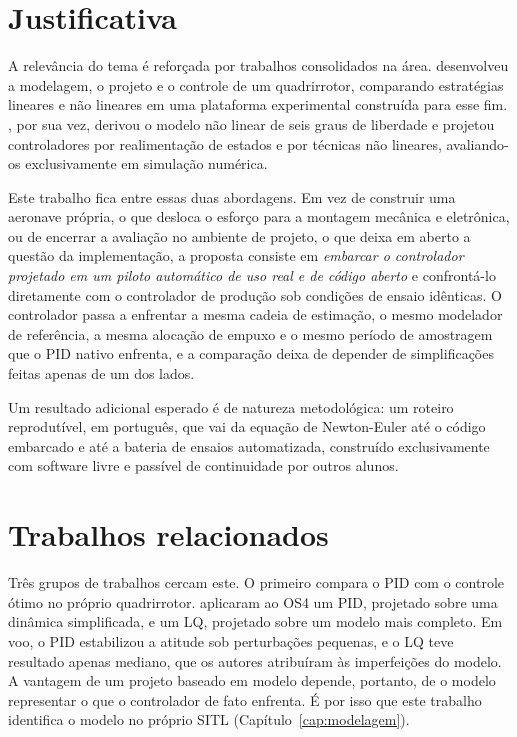 \section{Justificativa}
\label{sec:justificativa}

A relevância do tema é reforçada por trabalhos consolidados na área.
 desenvolveu a modelagem, o projeto e o
controle de um quadrirrotor, comparando estratégias lineares e não lineares em
uma plataforma experimental construída para esse fim.
, por sua vez, derivou o modelo não linear de seis
graus de liberdade e projetou controladores por realimentação de estados e
por técnicas não lineares, avaliando-os exclusivamente em simulação numérica.

Este trabalho fica entre essas duas abordagens. Em vez de
construir uma aeronave própria, o que desloca o esforço para a montagem
mecânica e eletrônica, ou de encerrar a avaliação no ambiente de projeto, o
que deixa em aberto a questão da implementação, a proposta consiste em
\emph{embarcar o controlador projetado em um piloto automático de uso real e
de código aberto} e confrontá-lo diretamente com o controlador de produção sob
condições de ensaio idênticas. O controlador passa a enfrentar a mesma cadeia
de estimação, o mesmo modelador de referência, a mesma alocação de empuxo e o
mesmo período de amostragem que o PID nativo enfrenta, e a comparação deixa de
depender de simplificações feitas apenas de um dos lados.

Um resultado adicional esperado é de natureza metodológica: um roteiro
reprodutível, em português, que vai da equação de Newton-Euler até o código
embarcado e até a bateria de ensaios automatizada, construído exclusivamente
com software livre e passível de continuidade por outros alunos.

\section{Trabalhos relacionados}
\label{sec:relacionados}

Três grupos de trabalhos cercam este. O primeiro compara o PID com o controle
ótimo no próprio quadrirrotor.  aplicaram ao OS4
um PID, projetado sobre uma dinâmica simplificada, e um LQ, projetado sobre um
modelo mais completo. Em voo, o PID estabilizou a atitude sob perturbações
pequenas, e o LQ teve resultado apenas mediano, que os autores atribuíram às
imperfeições do modelo. A vantagem de um projeto baseado em modelo depende,
portanto, de o modelo representar o que o controlador de fato enfrenta. É por
isso que este trabalho identifica o modelo no próprio SITL
(Capítulo~\ref{cap:modelagem}).

